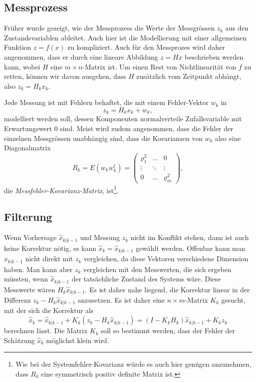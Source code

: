 \subsection{Messprozess\label{subsection:messprozess}}
Früher wurde gezeigt, wie der Messprozess die Werte der Messgrössen $z_k$
aus den Zustandsvariablen ableitet.
Auch hier ist die Modellierung mit einer allgemeinen Funktion $z=f(x)$ 
zu kompliziert.
Auch für den Messprozes wird daher angenommen, dass er durch eine
lineare Abbildung $z=Hx$ beschrieben werden kann, wobei $H$ eine
$m\times n$-Matrix ist.
Um einen Rest von Nichtlinearität von $f$ zu retten, können wir davon
ausgehen, dass $H$ zusätzlich vom Zeitpunkt abhängt, also $z_k=H_kx_k$.

Jede Messung ist mit Fehlern behaftet, die mit einem Fehler-Vektor
$w_k$ in
\begin{equation}
z_k = H_kx_k + w_k,
\label{skript:kalman:messfehler}
\end{equation}
modelliert werden soll,
dessen Komponenten normalverteile Zufallsvariable mit Erwartungswert $0$
sind.
Meist wird zudem angenommen, dass die Fehler der einzelnen Messgrössen
unabhängig sind, dass die Kovarianzen von $w_k$ also eine
Diagonalmatrix
\[
R_k = E(w_kw_k^t) =
\begin{pmatrix}
\varrho_1^2&\dots & 0\\
\vdots     &\ddots&\vdots\\
0          &\dots &\varrho_m^2
\end{pmatrix},
\]
die {\em Messfehler-Kovarianz-Matrix},
ist\footnote{Wie bei der Systemfehler-Kovarianz würde es auch hier
genügen anzunehmen, dass $R_k$ eine symmetrisch positiv definite Matrix
ist.}.
%
%

\subsection{Filterung\label{subsection:filterung}}
Wenn Vorhersage $\hat{x}_{k|k-1}$ und Messung $z_k$ nicht im Konflikt
stehen, dann ist auch keine Korrektur nötig, es kann
$\hat{x}_k = \hat{x}_{k|k-1}$ gewählt werden.
Offenbar kann man $\hat{x}_{k|k-1}$ nicht direkt mit $z_k$ vergleichen,
da diese Vektoren verschiedene Dimension haben.
Man kann aber $z_k$ vergleichen mit den Messwerten, die sich ergeben
müssten, wenn $\hat{x}_{k|k-1}$ der tatsächliche Zustand des Systems
wäre.
Diese Messwerte wären $H_k\hat{x}_{k|k-1}$.
Es ist daher nahe liegend,
die Korrektur linear in der Differenz $z_k-H_k\hat{x}_{k|k-1}$
anzusetzen.
Es ist daher eine $n\times m$-Matrix $K_k$ gesucht, mit der sich
die Korrektur als
\begin{equation}
\hat{x}_{k}
=
\hat{x}_{k|k-1} + K_k(z_k-H_k\hat{x}_{k|k-1})
=
(I-K_kH_k)\hat{x}_{k|k-1} + K_kz_k
\label{skript:kalman:filter}
\end{equation}
berechnen lässt.
Die Matrix $K_k$ soll so bestimmt werden, dass der Fehler der
Schätzung $\hat{x}_k$ möglichst klein wird.

